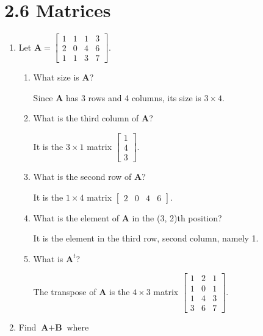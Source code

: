 \documentclass[11pt]{article}
\begin{document}
\section*{\textbf{2.6 Matrices}}
\begin{enumerate}[label=\textbf{\arabic*.}]
	\item Let $\textbf{A} =	
	\begin{bmatrix}
		1 & 1 & 1 & 3 \\
		2 & 0 & 4 & 6 \\
		1 & 1 & 3 & 7
	\end{bmatrix}$.
	
	\begin{enumerate}[label=\textbf{\alph*)}]
		\item What size is \textbf{A}?
		
		Since \textbf{A} has 3 rows and 4 columns, its size is $3 \times 4$.
		
		\item What is the third column of \textbf{A}?
		
		It is the $3 \times 1$ matrix 
		$\begin{bmatrix}
			1 \\
			4 \\
			3
		\end{bmatrix}$.
		
		\item What is the second row of \textbf{A}?
		
		It is the $1 \times 4$ matrix 
		$\begin{bmatrix}
			2 & 0 & 4 & 6
		\end{bmatrix}$.
		
		\item What is the element of \textbf{A} in the (3, 2)th position?
		
		It is the element in the third row, second column, namely 1.
		
		\item What is $\textbf{A}^t$?
		
		The transpose of \textbf{A} is the $4 \times 3$ matrix 
		$\begin{bmatrix}
			1 & 2 & 1 \\
			1 & 0 & 1 \\
			1 & 4 & 3 \\
			3 & 6 & 7 
		\end{bmatrix}$.
	\end{enumerate}

	\item Find $\textbf{A} + \textbf{B}$ where
	

\end{enumerate}
\end{document}
